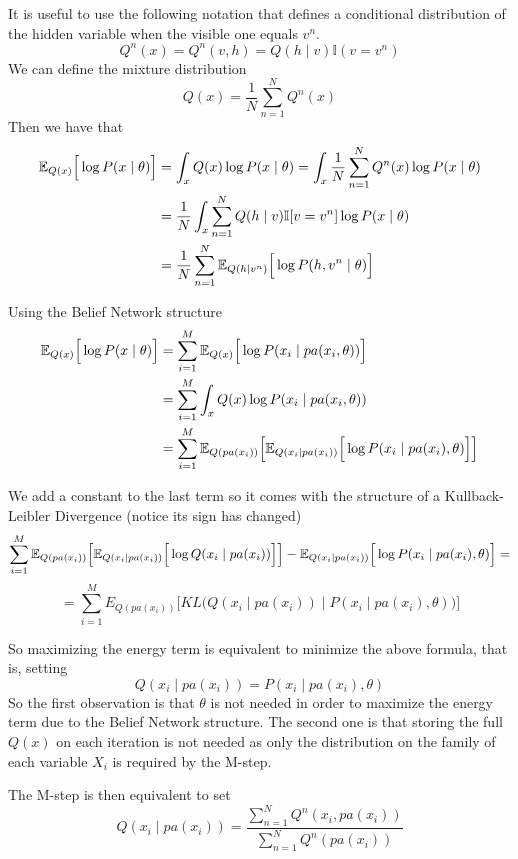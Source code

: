 It is useful to use the following notation that defines a conditional distribution of the hidden variable when the visible one equals \(v^{n}\).
\[
  Q^{n}(x) = Q^{n}(v,h) = Q(h \mid v) \mathbb{I}(v = v^{n})
\]
We can define the mixture distribution
\[
  Q(x) = \frac{1}{N}\sum_{n = 1}^{N}Q^{n}(x)
\]
Then we have that
\[
  \begin{aligned}
    \E{Q(x)}{\log{P(x \mid \theta)}} &= \int_{x}Q(x)\log{P(x \mid \theta)} =  \int_{x} \frac{1}{N}\sum_{n=1}^{N}Q^{n}(x)\log{P(x \mid \theta)} \\
    &= \frac{1}{N} \int_{x}\sum_{n=1}^{N}Q(h \mid v)\mathbb{I}[v = v^{n}]\log{P(x \mid \theta)}\\
    &= \frac{1}{N}\sum_{n = 1}^{N}\E{Q(h \mid v^{n})} {\log{P(h, v^{n} \mid \theta)}}
  \end{aligned}
  \vadjust{\todo{Deberia salir $P(x^{n} \mid \theta)$ pero no me sale}}
\]

Using the Belief Network structure
\[
  \begin{aligned}
    \E{Q(x)}{\log{P(x \mid \theta)}} &= \sum_{i = 1}^{M}\E{Q(x)}{\log{P(x_{i} \mid pa(x_{i}, \theta))}}\\
    &= \sum_{i=1}^{M} \int_{x}Q(x) \log{P(x_{i} \mid pa(x_{i}, \theta))}\\
    &= \sum_{i = 1}^{M}\E{Q(pa(x_{i}))}{ \E{Q(x_{i}\mid pa(x_{i}))}{ \log{P(x_{i} \mid pa(x_{i}), \theta)}}}
\end{aligned}  \vadjust{\todo[inline]{No veo esta última igualdad}}
\]

We add a constant to the last term so it comes with the structure of a Kullback-Leibler Divergence (notice its sign has changed)
\[
  \sum_{i = 1}^{M}\mathbb{E}_{Q(pa(x_{i}))}\Big[\mathbb{E}_{Q(x_{i}\mid pa(x_{i}))}\Big[\log{Q(x_{i} \mid pa(x_{i}))}\Big]\Big] - \mathbb{E}_{Q(x_{i}\mid pa(x_{i}))}\Big[\log{P(x_{i} \mid pa(x_{i}), \theta)}\Big]=
\]
\[
  = \sum_{i = 1}^{M} E_{Q(pa(x_{i}))} \Big[KL \Big( Q(x_{i}\mid pa(x_{i})) \mid P(x_{i} \mid pa(x_{i}), \theta) \Big) \Big]
\]

So maximizing the energy term is equivalent to minimize the above formula, that is, setting
\[
  Q(x_{i} \mid pa(x_{i})) = P(x_{i} \mid pa(x_{i}), \theta)
\]
So the first observation is that \(\theta\) is not needed in order to maximize the energy term due to the Belief Network structure. The second one is that storing the full \(Q(x)\) on each iteration is not needed as only the distribution on the family of each variable \(X_{i}\) is required by the M-step.

The M-step is then equivalent to set
\[
  Q(x_{i} \mid pa(x_{i})) = \frac{\sum_{n = 1}^{N} Q^{n}(x_{i}, pa(x_{i}))}{\sum_{n=1}^{N} Q^{n}(pa(x_{i}))}
\]

